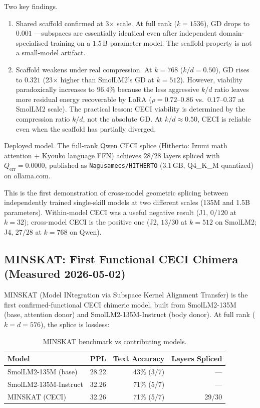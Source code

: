 \documentclass[11pt]{article}
\begin{document}
Two key findings.
\begin{enumerate}
\item Shared scaffold confirmed at 3$\times$ scale.  At full rank
      ($k{=}1536$), GD drops to $0.001$ ---subspaces are essentially
      identical even after independent domain-specialised training on a
      $1.5$\,B parameter model.  The scaffold property is not a small-model
      artifact.
\item Scaffold weakens under real compression.  At $k{=}768$
      ($k/d{=}0.50$), GD rises to $0.321$ (23$\times$ higher than
      SmolLM2's GD at $k{=}512$).  However, viability paradoxically
      increases to $96.4\%$ because the less aggressive $k/d$ ratio
      leaves more residual energy recoverable by LoRA ($\rho{=}0.72$--$0.86$
      vs.\ $0.17$--$0.37$ at SmolLM2 scale).  The practical lesson: CECI
      viability is determined by the compression ratio $k/d$, not the
      absolute GD.  At $k/d{\approx}0.50$, CECI is reliable even when the
      scaffold has partially diverged.
\end{enumerate}

Deployed model.  The full-rank Qwen CECI splice (Hitherto:
Izumi math attention + Kyouko language FFN) achieves $28/28$ layers
spliced with $Q_{\text{err}}{=}0.0000$, published as
\texttt{Nagusamecs/HITHERTO} (3.1\,GB, Q4\_K\_M quantized) on
ollama.com.

This is the first demonstration of cross-model geometric splicing
between independently trained single-skill models at two different scales
(135M and 1.5B parameters).  Within-model CECI was a useful negative
result (J1, $0/120$ at $k{=}32$); cross-model CECI is the positive one
(J2, $13/30$ at $k{=}512$ on SmolLM2; J4, $27/28$ at $k{=}768$ on Qwen).

\subsection{MINSKAT: First Functional CECI Chimera (Measured 2026-05-02)}

MINSKAT (Model INtegration via Subspace Kernel Alignment Transfer)
is the first confirmed-functional CECI chimeric model, built from
SmolLM2-135M (base, attention donor) and SmolLM2-135M-Instruct (body donor).
At full rank ($k{=}d{=}576$), the splice is lossless:

\begin{table}[h]\centering\small
\caption{MINSKAT benchmark vs contributing models.}
\begin{tabular}{@{}lrrr@{}}
\toprule
Model & PPL & Text Accuracy & Layers Spliced \\
\midrule
SmolLM2-135M (base)   & 28.22 & 43\% (3/7)  & --- \\
SmolLM2-135M-Instruct & 32.26 & 71\% (5/7)  & --- \\
MINSKAT (CECI) & 32.26 & 71\% (5/7) & 29/30 \\
\bottomrule
\end{tabular}
\end{table}
\end{document}
